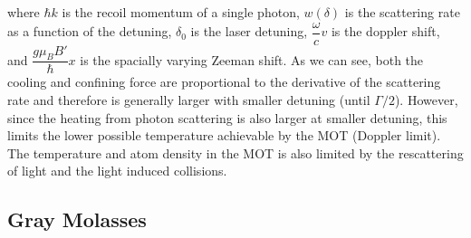 where $\hbar k$ is the recoil momentum of a single photon, $w(\delta)$ is the scattering rate as a function of the detuning, $\delta_0$ is the laser detuning, $\dfrac{\omega}{c}v$ is the doppler shift, and $\dfrac{g\mu_BB'}{\hbar}x$ is the spacially varying Zeeman shift. As we can see, both the cooling and confining force are proportional to the derivative of the scattering rate and therefore is generally larger with smaller detuning (until $\Gamma/2$). However, since the heating from photon scattering is also larger at smaller detuning, this limits the lower possible temperature achievable by the MOT (Doppler limit). The temperature and atom density in the MOT is also limited by the rescattering of light and the light induced collisions.

\subsection{Gray Molasses}\label{theory:gm}

